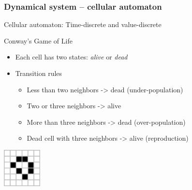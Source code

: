 \documentclass{beamer}
\newcommand{\heading}[1]{\frametitle{#1}}
\begin{document}
\begin{frame}[fragile]
 \heading{Dynamical system -- cellular automaton}
 
 Cellular automaton: Time-discrete and value-discrete
 
 \vspace{2ex}
 Conway's Game of Life
 
 \begin{itemize}
  \item Each cell has two states: {\it alive} or {\it dead}
  \item Transition rules
  \begin{itemize}
    \item Less than two neighbors -> dead (under-population)
    \item Two or three neighbors -> alive 
    \item More than three neighbors -> dead (over-population)
    \item Dead cell with three neighbors -> alive (reproduction)
  \end{itemize}
 \end{itemize}
 
 \vspace{1ex}
 \centerline{\includegraphics[draft=false,width=0.148485\textwidth]
{98px-Game_of_life_loaf.png}}

\end{frame}
\end{document}
